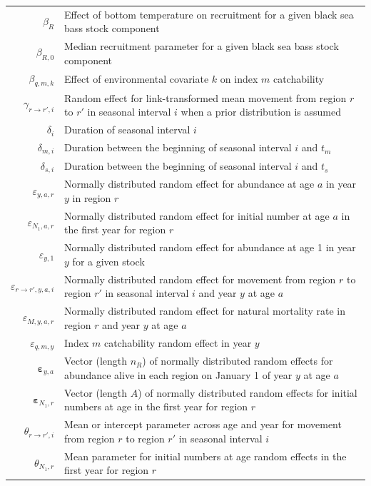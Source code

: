 \documentclass[
]{article}
\begin{document}
\begin{longtable}[c]{r p{}}
$\beta_R$ & Effect of bottom temperature on recruitment for a given black sea bass stock component\\
$\beta_{R,0}$ & Median recruitment parameter for a given black sea bass stock component\\
$\beta_{q,m,k}$ & Effect of environmental covariate $k$ on index $m$ catchability\\
$\gamma_{r\rightarrow r',i}$ & Random effect for link-transformed mean movement from region $r$ to $r'$ in seasonal interval $i$ when a prior distribution is assumed\\
$\delta_i$ & Duration of seasonal interval $i$\\
$\delta_{m,i}$ & Duration between the beginning of seasonal interval $i$ and $t_m$\\
$\delta_{s,i}$ & Duration between the beginning of seasonal interval $i$ and $t_s$ \\
$\varepsilon_{y,a,r}$ & Normally distributed random effect for abundance at age $a$ in year $y$ in region $r$\\
$\varepsilon_{N_1,a,r}$ & Normally distributed random effect for initial number at age $a$ in the first year for region $r$\\ 
$\varepsilon_{y,1}$ & Normally distributed random effect for abundance at age 1 in year $y$ for a given stock\\
$\varepsilon_{r\rightarrow r',y,a,i}$ & Normally distributed random effect for movement from region $r$ to region $r'$ in seasonal interval $i$ and year $y$ at age $a$\\
$\varepsilon_{M,y,a,r}$ & Normally distributed random effect for natural mortality rate in region $r$ and year $y$ at age $a$\\
$\varepsilon_{q,m,y}$ & Index $m$ catchability random effect in year $y$\\
$\boldsymbol{\varepsilon}_{y,a}$ & Vector (length $n_R$) of normally distributed random effects for abundance alive in each region on January 1 of year $y$ at age $a$\\
$\boldsymbol{\varepsilon}_{N_1,r}$ & Vector (length $A$) of normally distributed random effects for initial numbers at age in the first year for region $r$\\ 
$\theta_{r\rightarrow r',i}$ & Mean or intercept parameter across age and year for movement from region $r$ to region $r'$ in seasonal interval $i$\\
$\theta_{N_1,r}$ & Mean parameter for initial numbers at age random effects in the first year for region $r$\\

\end{longtable}
\end{document}
